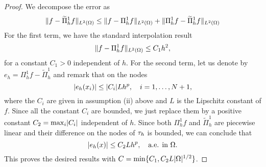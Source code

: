 \documentclass[10pt]{article}
\begin{document}
\begin{proof} We decompose the error as
	\begin{equation*}
		\lVert f - \widetilde \Pi_h^1f\rVert_{L^2(\Omega)} \leq \lVert f - \Pi_h^1f\rVert_{L^2(\Omega)} + \lVert\Pi_h^1f - \widetilde \Pi_h^1f\rVert_{L^2(\Omega)}
	\end{equation*}
	For the first term, we have the standard interpolation result
	\begin{equation}
		\lVert f - \Pi_h^1f\rVert_{L^2(\Omega)} \leq C_1h^2,
	\end{equation}
	for a constant $C_1 > 0$ independent of $h$. For the second term, let us denote by $e_h = \Pi_h^1f - \widetilde \Pi_h^1$ and remark that on the nodes
	\begin{equation*}
		\lvert e_h(x_i)\rvert \leq \lvert C_i\rvert L h^p, \quad i = 1, \ldots, N+1,
	\end{equation*}
	where the $C_i$ are given in assumption (ii) above and $L$ is the Lipschitz constant of $f$. Since all the constant $C_i$ are bounded, we just replace them by a positive constant $C_2 = \max_{i} \lvert C_i\rvert$ independent of $h$. Since both $\Pi_h^1 f$ and $\widetilde \Pi_h^1$ are piecewise linear and their difference on the nodes of $\tau_h$ is bounded, we can conclude that
	\begin{equation*}
		\lvert e_h(x)\rvert \leq C_2 L h^p, \quad \text{a.e. in } \Omega.
	\end{equation*}
	This proves the desired results with $C = \min\{C_1, C_2 L\lvert\Omega\rvert^{1/2}\}$.
\end{proof}
\end{document}
